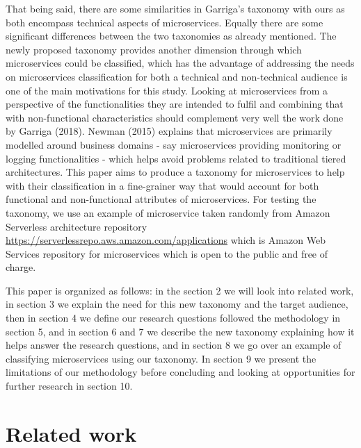 \documentclass{article}
\begin{document}
That being said, there are some similarities in Garriga’s taxonomy with ours as both encompass technical aspects of microservices. Equally there are some significant differences between the two taxonomies as already mentioned. The newly proposed taxonomy provides another dimension through which microservices could be classified, which has the advantage of addressing the needs on microservices classification for both a technical and non-technical audience is one of the main motivations for this study. Looking at microservices from a perspective of the functionalities they are intended to fulfil and combining that with non-functional characteristics should complement very well the work done by Garriga (2018). Newman (2015) explains that microservices are primarily modelled around business domains - say microservices providing monitoring or logging functionalities - which helps avoid problems related to traditional tiered architectures. This paper aims to produce a taxonomy for microservices to help with their classification in a fine-grainer way that would account for both functional and non-functional attributes of microservices. For testing the taxonomy, we use an example of microservice taken randomly from Amazon Serverless architecture repository \url{https://serverlessrepo.aws.amazon.com/applications} which is Amazon Web Services repository for microservices which is open to the public and free of charge. 

This paper is organized as follows: in the section 2 we will look into related work, in section 3 we explain the need for this new taxonomy and the target audience, then in section 4 we define our research questions followed the methodology in section 5, and in section 6 and 7 we describe the new taxonomy explaining how it helps answer the research questions, and in section 8 we go over an example of classifying microservices using our taxonomy. In section 9 we present the limitations of our methodology before concluding and looking at opportunities for further research in section 10.



\section{Related work}
\end{document}
